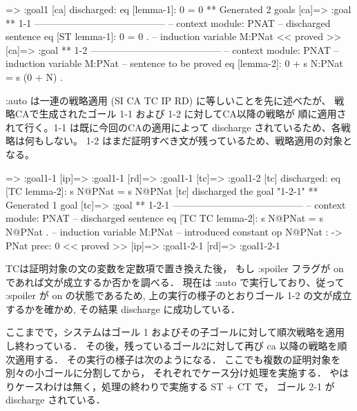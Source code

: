 \documentclass[a4paper,oneside,10pt,here]{memoir}
\newenvironment{vvtm}%
{\parskip=0pt\lineskip=0pt\begin{center}\begin{minipage}{0.8\textwidth}\begin{snugshade}}%
  {\end{snugshade}\end{minipage}\end{center}}
\begin{document}
\begin{vvtm}
\begin{simplev}
[ca]=> :goal{1}
[ca] discharged: eq [lemma-1]: 0 = 0
** Generated 2 goals
[ca]=>
:goal { ** 1-1 -----------------------------------------
  -- context module: PNAT
  -- discharged sentence
    eq [ST lemma-1]: 0 = 0 .
  -- induction variable
    M:PNat
} << proved >>
[ca]=>
:goal { ** 1-2 -----------------------------------------
  -- context module: PNAT
  -- induction variable
    M:PNat
  -- sentence to be proved
    eq [lemma-2]: 0 + s N:PNat = s (0 + N) .
}
\end{simplev}
\end{vvtm}
:auto は一連の戦略適用 (SI CA TC IP RD) に等しいことを先に述べたが、
戦略CAで生成されたゴール 1-1 および 1-2 に対してCA以降の戦略が
順に適用されて行く。1-1 は既に今回のCAの適用によって discharge
されているため、各戦略は何もしない。
1-2 はまだ証明すべき文が残っているため、戦略適用の対象となる。
\begin{vvtm}
\begin{simplev}
[tc]=> :goal{1-1}
[ip]=> :goal{1-1}
[rd]=> :goal{1-1}
[tc]=> :goal{1-2}
[tc] discharged: 
  eq [TC lemma-2]: s N@PNat = s N@PNat
[tc] discharged the goal "1-2-1"
** Generated 1 goal
[tc]=>
:goal { ** 1-2-1 -----------------------------------------
  -- context module: PNAT
  -- discharged sentence
    eq [TC TC lemma-2]: s N@PNat = s N@PNat .
  -- induction variable
    M:PNat
  -- introduced constant
    op N@PNat : -> PNat { prec: 0 }
} << proved >>
[ip]=> :goal{1-2-1}
[rd]=> :goal{1-2-1}
\end{simplev}
\end{vvtm}
TCは証明対象の文の変数を定数項で置き換えた後，
もし :spoiler フラグが on であれば文が成立するか否かを調べる．
現在は :auto で実行しており、従って :spoiler が on の状態であるため,
上の実行の様子のとおりゴール 1-2 の文が成立するかを確かめ,
その結果 discharge に成功している．

ここまでで，システムはゴール 1 およびその子ゴールに対して順次戦略を適用し終わっている．
その後，残っているゴール2に対して再び ca 以降の戦略を順次適用する．
その実行の様子は次のようになる．
ここでも複数の証明対象を別々の小ゴールに分割してから，
それぞれでケース分け処理を実施する．
やはりケースわけは無く，処理の終わりで実施する ST + CT で，
ゴール 2-1 が discharge されている．
\end{document}
